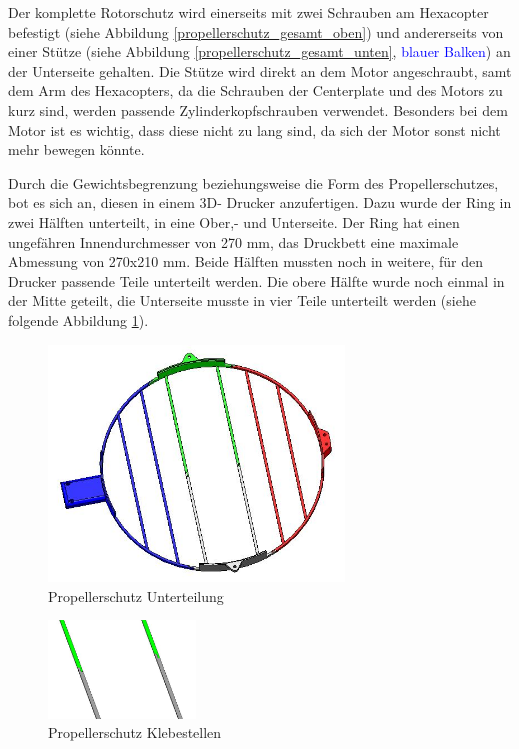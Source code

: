 	Der komplette Rotorschutz wird einerseits mit zwei Schrauben am Hexacopter befestigt (siehe Abbildung \ref{propellerschutz_gesamt_oben}) und andererseits von einer Stütze (siehe Abbildung  \ref{propellerschutz_gesamt_unten},
	\textcolor{blue}{blauer Balken}) an der Unterseite gehalten.
	Die Stütze wird direkt an dem Motor angeschraubt, samt dem Arm des Hexacopters, da die Schrauben der Centerplate und des Motors zu kurz sind, werden passende Zylinderkopfschrauben verwendet.
	Besonders bei dem Motor ist es wichtig, dass diese nicht zu lang sind, da sich der Motor sonst nicht mehr bewegen könnte.

	Durch die Gewichtsbegrenzung beziehungsweise die Form des Propellerschutzes, bot es sich an, diesen in einem 3D- Drucker anzufertigen.
	Dazu wurde der Ring in zwei Hälften unterteilt, in eine Ober,- und Unterseite.
	Der Ring hat einen ungefähren Innendurchmesser von 270 mm, das Druckbett eine maximale Abmessung von 270x210 mm.
	Beide Hälften mussten noch in weitere, für den Drucker passende Teile unterteilt werden.
	Die obere Hälfte wurde noch einmal in der Mitte geteilt, die Unterseite musste in vier Teile unterteilt werden (siehe folgende Abbildung \ref{propellerschutz_mitte_unterteilung}).

			\begin{figure}[H]
			\begin{centering}
			\includegraphics[width = 0.7\textwidth]{Bilder/propellerschutz_mitte_unterteilung}
			\par\end{centering}
			\caption{Propellerschutz Unterteilung}
			\label{propellerschutz_mitte_unterteilung}
			\end{figure}

			\begin{figure}[H]
			\begin{centering}
			\includegraphics[width = 0.35\textwidth]{Bilder/propellerschutz_klebestellen}
			\par\end{centering}
			\caption{Propellerschutz Klebestellen}
			\label{propellerschutz_klebestellen}
			\end{figure}

